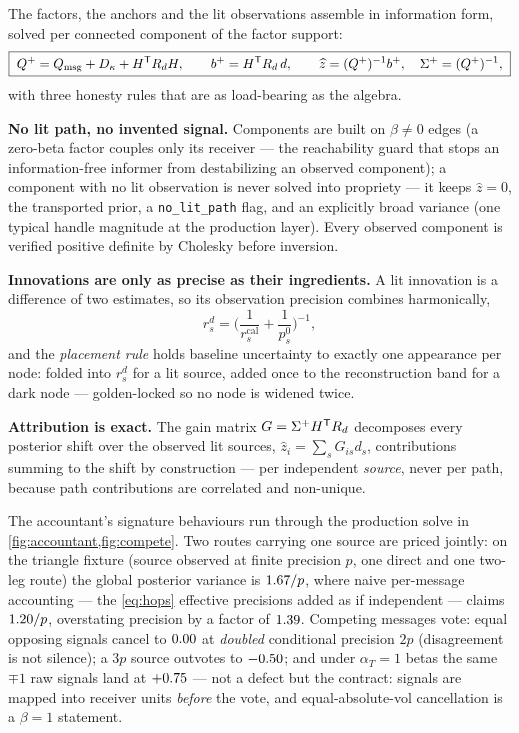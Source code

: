 \documentclass[11pt]{article}
\newcommand{\Qmsg}{Q_{\mathrm{msg}}}
\begin{document}
The factors, the anchors and the lit observations assemble in
information form, solved per connected component of the factor support:
\begin{equation}
\boxed{\;
Q^+=\Qmsg+D_\kappa+H\T R_d H,
\qquad
b^+=H\T R_d\,d,
\qquad
\widehat z=(Q^+)^{-1}b^+,\quad \Sigma^+=(Q^+)^{-1},
\;}
\label{eq:posterior}
\end{equation}
with three honesty rules that are as load-bearing as the algebra.

\textbf{No lit path, no invented signal.}  Components are built on
$\beta\neq0$ edges (a zero-beta factor couples only its receiver ---
the reachability guard that stops an information-free informer from
destabilizing an observed component); a component with no lit
observation is never solved into propriety --- it keeps
$\widehat z=0$, the transported prior, a \texttt{no\_lit\_path} flag,
and an explicitly broad variance (one typical handle magnitude at the
production layer).  Every observed component is verified positive
definite by Cholesky before inversion.

\textbf{Innovations are only as precise as their ingredients.}  A lit
innovation is a difference of two estimates, so its observation
precision combines harmonically,
\begin{equation}
r^d_s=\Big(\frac{1}{r^{\mathrm{cal}}_s}+\frac{1}{p^0_s}\Big)^{-1},
\label{eq:rd}
\end{equation}
and the \emph{placement rule} holds baseline uncertainty to exactly one
appearance per node: folded into $r^d_s$ for a lit source, added once
to the reconstruction band for a dark node --- golden-locked so no node
is widened twice.

\textbf{Attribution is exact.}  The gain matrix $G=\Sigma^+H^{\mathsf{T}} R_d$
decomposes every posterior shift over the observed lit sources,
$\widehat z_i=\sum_sG_{is}d_s$, contributions summing to the shift by
construction --- per independent \emph{source}, never per path, because
path contributions are correlated and non-unique.

The accountant's signature behaviours run through the production solve
in \cref{fig:accountant,fig:compete}.  Two routes carrying one source
are priced jointly: on the triangle fixture (source observed at finite
precision $p$, one direct and one two-leg route) the global posterior
variance is $1.67/p$, where naive per-message accounting ---
the \cref{eq:hops} effective precisions added as if independent ---
claims $1.20/p$, overstating precision by a factor of
$1.39$.  Competing
messages vote: equal opposing signals cancel to $0.00$ at
\emph{doubled} conditional precision $2p$ (disagreement is not
silence); a $3p$ source outvotes to $-0.50$; and under
$\alpha_T=1$ betas the same $\mp1$ raw signals land at
$+0.75$ --- not a defect but the contract: signals are
mapped into receiver units \emph{before} the vote, and
equal-absolute-vol cancellation is a $\beta=1$ statement.
\end{document}
